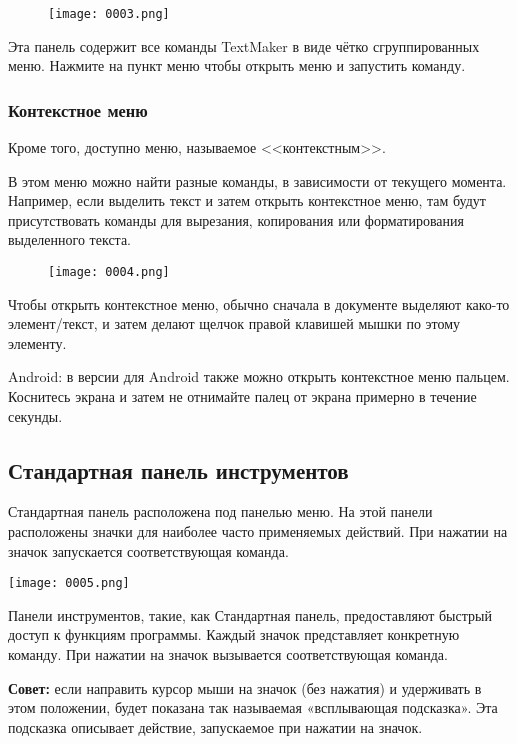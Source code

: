 \documentclass[a4paper,10pt]{article}
\begin{document}
\begin{figure}[ht]
\texttt{[image: 0003.png]}
\centering
\end{figure}
Эта панель содержит все команды TextMaker в виде чётко сгруппированных меню. Нажмите на пункт меню чтобы открыть меню и запустить команду.

\subsubsection{Контекстное меню}
Кроме того, доступно меню, называемое <<контекстным>>.

В этом меню можно найти разные команды, в зависимости от текущего момента. Например, если выделить текст и затем открыть контекстное меню, там будут присутствовать команды для вырезания, копирования или форматирования выделенного текста.

\begin{figure}[ht]
\texttt{[image: 0004.png]}
\end{figure}

Чтобы открыть контекстное меню, обычно сначала в документе выделяют како-то элемент/текст, и затем делают щелчок правой клавишей мышки по этому элементу.

Android: в версии для Android также можно открыть контекстное меню пальцем. Коснитесь экрана и затем не отнимайте палец от экрана примерно в течение секунды.

\subsection{Стандартная панель инструментов}

Стандартная панель расположена под панелью меню. На этой панели расположены значки для наиболее часто применяемых действий. При нажатии на значок запускается соответствующая команда.

\texttt{[image: 0005.png]}

Панели инструментов, такие, как Стандартная панель, предоставляют быстрый доступ к функциям программы. Каждый значок представляет конкретную команду. При нажатии на значок вызывается соответствующая команда.

\begin{mdframed}[backgroundcolor=blue!10]
\textbf{Совет:} если направить курсор мыши на значок (без нажатия) и удерживать в этом положении,  будет показана так называемая «всплывающая подсказка». Эта подсказка описывает действие, запускаемое при нажатии на значок. 
\end{mdframed}
\end{document}
